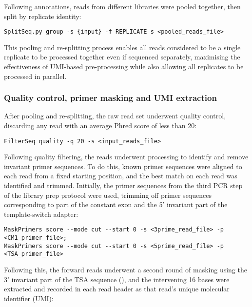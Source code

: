 \noindent Following annotations, reads from different libraries were pooled together, then split by replicate identity:

\begin{lstlisting}
SplitSeq.py group -s {input} -f REPLICATE s <pooled_reads_file>
\end{lstlisting}

\noindent This pooling and re-splitting process enables all reads considered to be a single replicate to be processed together even if sequenced separately, maximising the effectiveness of UMI-based pre-processing while also allowing all replicates to be processed in parallel.

\subsubsection{Quality control, primer masking and UMI extraction}
\label{sec:methods_comp_igpreproc_mask}

After pooling and re-splitting, the raw read set underwent quality control, discarding any read with an average Phred score \parencite{ewing1998phred} of less than 20:

\begin{lstlisting}
FilterSeq quality -q 20 -s <input_reads_file>
\end{lstlisting}

\noindent Following quality filtering, the reads underwent processing to identify and remove invariant primer sequences. To do this, known primer sequences were aligned to each read from a fixed starting position, and the best match on each read was identified and trimmed. Initially, the primer sequences from the third PCR step of the library prep protocol were used, trimming off primer sequences corresponding to part of the constant  exon and the 5' invariant part of the template-switch adapter:

\begin{lstlisting}
MaskPrimers score --mode cut --start 0 -s <3prime_read_file> -p <CM1_primer_file>;
MaskPrimers score --mode cut --start 0 -s <5prime_read_file> -p <TSA_primer_file>
\end{lstlisting}

\noindent Following this, the forward reads underwent a second round of masking using the 3' invariant part of the TSA sequence (), and the intervening 16 bases were extracted and recorded in each read header as that read's unique molecular identifier (UMI):

